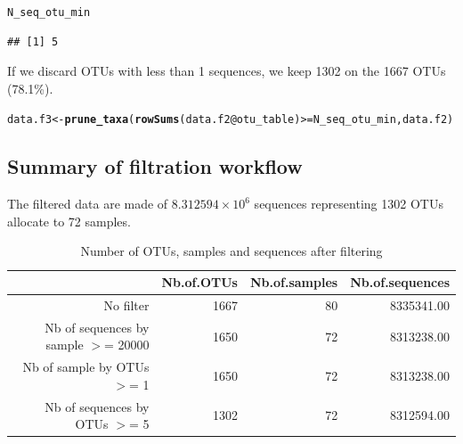 \documentclass[12pt]{article}\usepackage[]{graphicx}\usepackage[]{color}
\makeatletter
\newcommand{\hlopt}[1]{\textcolor[rgb]{0,0,0}{#1}}%
\newcommand{\hlstd}[1]{\textcolor[rgb]{0.345,0.345,0.345}{#1}}%
\newcommand{\hlkwb}[1]{\textcolor[rgb]{0.69,0.353,0.396}{#1}}%
\newcommand{\hlkwc}[1]{\textcolor[rgb]{0.333,0.667,0.333}{#1}}%
\newcommand{\hlkwd}[1]{\textcolor[rgb]{0.737,0.353,0.396}{\textbf{#1}}}%
\newenvironment{kframe}{%
 \def\at@end@of@kframe{}%
 \ifinner\ifhmode%
  \def\at@end@of@kframe{\end{minipage}}%
  \begin{minipage}{\columnwidth}%
 \fi\fi%
 \def\FrameCommand##1{\hskip\@totalleftmargin \hskip-\fboxsep
 \colorbox{shadecolor}{##1}\hskip-\fboxsep
     \hskip-\linewidth \hskip-\@totalleftmargin \hskip\columnwidth}%
 \MakeFramed {\advance\hsize-\width
   \@totalleftmargin\z@ \linewidth\hsize
   \@setminipage}}%
 {\par\unskip\endMakeFramed%
 \at@end@of@kframe}
\newenvironment{knitrout}{}{} %
\numberwithin{figure}{section}
\makeatother
\begin{document}
\begin{knitrout}\small
{}\color{fgcolor}\begin{kframe}
\begin{alltt}
\hlstd{N_seq_otu_min}
\end{alltt}
\begin{verbatim}
## [1] 5
\end{verbatim}
\end{kframe}
\end{knitrout}

If we discard OTUs with less than 1 sequences, we keep 1302 on the 1667 OTUs (78.1\%).

\begin{knitrout}\small
{}\color{fgcolor}\begin{kframe}
\begin{alltt}
\hlstd{data.f3} \hlkwb{<-} \hlkwd{prune_taxa}\hlstd{(}\hlkwd{rowSums}\hlstd{(data.f2}\hlopt{@}\hlkwc{otu_table}\hlstd{)} \hlopt{>=} \hlstd{N_seq_otu_min, data.f2)}
\end{alltt}
\end{kframe}
\end{knitrout}

\subsection{Summary of filtration workflow}

The filtered data are made of \ensuremath{8.312594\times 10^{6}} sequences representing 1302 OTUs allocate to 72 samples.




\begin{table}[ht]
\centering
\begin{tabular}{rrrr}
  \hline
 & Nb.of.OTUs & Nb.of.samples & Nb.of.sequences \\ 
  \hline
No filter & 1667 &  80 & 8335341.00 \\ 
  Nb of sequences by sample $>$=  20000 & 1650 &  72 & 8313238.00 \\ 
  Nb of sample by OTUs $>$=  1 & 1650 &  72 & 8313238.00 \\ 
  Nb of sequences by OTUs $>$=  5 & 1302 &  72 & 8312594.00 \\ 
   \hline
\end{tabular}
\caption{Number of OTUs, samples and sequences after filtering} 
\end{table}
\end{document}
